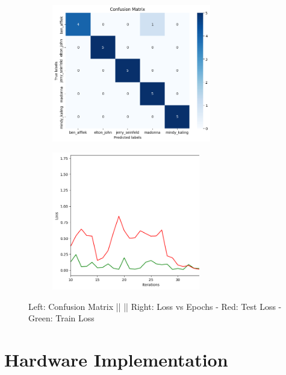 \documentclass{article}
\begin{document}
\begin{enumerate}
\begin{figure}[!hbt]
    \begin{subfigure}{0.5\textwidth}
        \centering
        \includegraphics[height=6cm]{confusion_matrix.png}
        \hspace{2em}
    \end{subfigure}
    \begin{subfigure}{0.5\textwidth}
        \centering
        \includegraphics[height=6cm]{loss_epoch.png}
    \end{subfigure}
    \caption{Left: Confusion Matrix || || Right: Loss vs Epochs - Red: Test Loss - Green: Train Loss}
\end{figure}
    
    \end{enumerate}
\section{Hardware Implementation}
  
\end{document}
